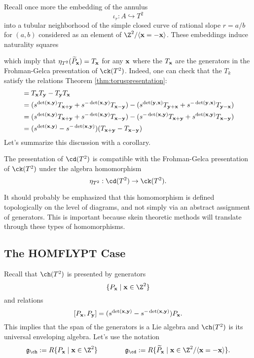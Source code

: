 Recall once more the embedding of the annulus
\[
\iota_r: A \hookrightarrow T^2
\]
into a tubular neighborhood of the simple closed curve of rational slope $r=a/b$ for $(a, b)$ considered as an element of $\Z^2 / \langle \xx = - \xx \rangle$. These embeddings induce naturality squares
\begin{center}
\end{center}
which imply that $\eta_{T^2}(\widetilde{P}_{\mathbf{x}}) = T_{\mathbf{x}}$ for any ${\mathbf{x}}$ where the $T_{\mathbf{x}}$ are the generators in the Frohman-Gelca presentation of $\ck(T^2)$. Indeed, one can check that the $T_k$ satisfy the relations Theorem \ref{thm:toruspresentation}:
\begin{align*}
[T_\xx, T_\yy] &= T_\xx T_\yy - T_\yy T_\xx \\
&= (s^{\det(\xx, \yy)} T_{\xx + \yy} + s^{-\det(\xx, \yy)} T_{\xx - \yy}) - (s^{\det(\yy, \xx)} T_{\yy + \xx} + s^{-\det(\yy, \xx)} T_{\yy - \xx}) \\
&= (s^{\det(\xx, \yy)} T_{\xx + \yy} + s^{-\det(\xx, \yy)} T_{\xx - \yy}) - (s^{-\det(\xx, \yy)} T_{\xx + \yy} + s^{\det(\xx, \yy)} T_{\xx - \yy}) \\
&= (s^{\det(\xx, \yy)} - s^{-\det(\xx, \yy)}) (T_{\xx + \yy} - T_{\xx - \yy})
\end{align*}
Let's summarize this discussion with a corollary.
\begin{corollary} \label{cor:frohmangelcacompatibility}
The presentation of $\cd(T^2)$ is compatible with the Frohman-Gelca presentation of $\ck(T^2)$ under the algebra homomorphism
\[
\eta_{T^2}: \cd(T^2) \to \ck(T^2).
\]
\end{corollary}

It should probably be emphasized that this homomorphism is defined topologically on the level of diagrams, and not simply via an abstract assignment of generators. This is important because skein theoretic methods will translate through these types of homomorphisms. 


\subsection{The HOMFLYPT Case}

Recall that $\ch(T^2)$ is presented by generators 
\[
\{ P_\xx \mid \xx \in \Z^2 \}
\]
and relations
\[
[P_{\mathbf{x}}, P_{\mathbf{y}}] = (s^{\det({\mathbf{x}}, {\mathbf{y}})} - s^{-\det({\mathbf{x}}, {\mathbf{y}})}) P_{\mathbf{x}}.
\]
This implies that the span of the generators is a Lie algebra and $\ch(T^2)$ is its universal enveloping algebra. Let's use the notation 
\[
\mathfrak{g}_\ch := R\{ P_\xx \mid \xx \in \Z^2 \} \qquad \qquad \mathfrak{g}_\cd := R\{ \widetilde{P}_\xx \mid \xx \in \Z^2 / \langle \xx = -\xx \rangle \}.
\]

